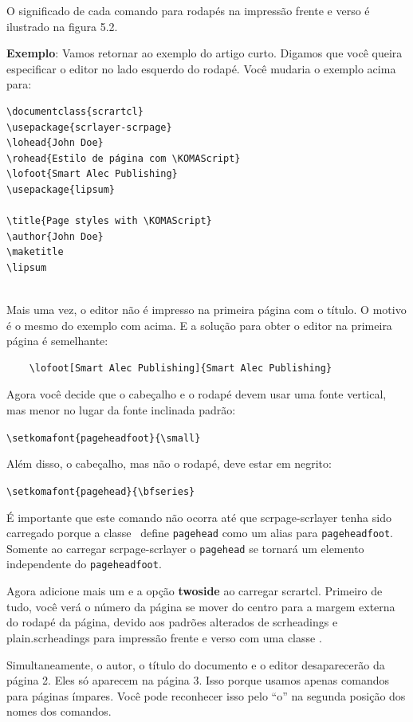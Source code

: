 O significado de cada comando para rodapés na impressão frente e verso é ilustrado na figura 5.2.

\textbf{Exemplo}: Vamos retornar ao exemplo do artigo curto. Digamos que você queira especificar o editor no lado esquerdo do rodapé. Você mudaria o exemplo acima para:

 \begin{verbatim}
\documentclass{scrartcl}
\usepackage{scrlayer-scrpage}
\lohead{John Doe}
\rohead{Estilo de página com \KOMAScript}
\lofoot{Smart Alec Publishing}
\usepackage{lipsum}

\title{Page styles with \KOMAScript}
\author{John Doe}
\maketitle
\lipsum
   
\end{verbatim}  

Mais uma vez, o editor não é impresso na primeira página com o título. O motivo é o mesmo do exemplo com  acima. E a solução para obter o editor na primeira página é semelhante:
\begin{verbatim}
    \lofoot[Smart Alec Publishing]{Smart Alec Publishing}
\end{verbatim}

Agora você decide que o cabeçalho e o rodapé devem usar uma fonte vertical, mas menor no lugar da fonte inclinada padrão:

\verb|\setkomafont{pageheadfoot}{\small}|

Além disso, o cabeçalho, mas não o rodapé, deve estar em negrito:

\verb|\setkomafont{pagehead}{\bfseries}|

É importante que este comando não ocorra até que scrpage-scrlayer tenha sido carregado porque a classe \KOMAScript\ define \texttt{pagehead} como um alias para \texttt{pageheadfoot}. Somente ao carregar scrpage-scrlayer o \texttt{pagehead} se tornará um elemento independente do \texttt{pageheadfoot}.

Agora adicione mais um  e a opção \textbf{twoside} ao carregar scrartcl. Primeiro de tudo, você verá o número da página se mover do centro para a margem externa do rodapé da página, devido aos padrões alterados de scrheadings e plain.scrheadings para impressão frente e verso com uma classe \KOMAScript.

Simultaneamente, o autor, o título do documento e o editor desaparecerão da página 2. Eles só aparecem na página 3. Isso porque usamos apenas comandos para páginas ímpares. Você pode reconhecer isso pelo “o” na segunda posição dos nomes dos comandos.

